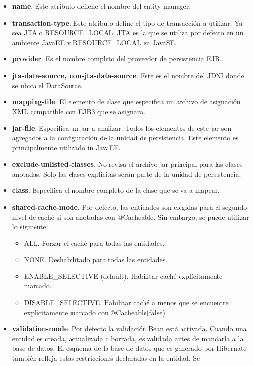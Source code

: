 \documentclass[a4paper,12pt]{article}
\begin{document}
\begin{itemize}
 \item \textbf{name}. Este atributo defiene el nombre del entity manager.
 \item \textbf{transaction-type}. Este atributo define el tipo de transacción a 
utilizar. Ya sea JTA o RESOURCE\_LOCAL, JTA es la que se utiliza por defecto en 
un ambiente JavaEE y RESOURCE\_LOCAL en JavaSE.
\item \textbf{provider}. Es el nombre completo del proveedor de persistencia 
EJB.
\item \textbf{jta-data-source, non-jta-data-source}. Este es el nombre del JDNI 
donde se ubica el DataSource.
\item \textbf{mapping-file}. El elemento de clase que especifica un archivo de 
asignación XML compatible con EJB3 que se asignara.
\item \textbf{jar-file}. Especifica un jar a analizar. Todos los elementos de 
este jar son agregados a la configuración de la unidad de persistencia. Este 
elemento es principalmente utilizado in JavaEE.
\item \textbf{exclude-unlisted-classes}. No revisa el archivo jar principal 
para las clases anotadas. Solo las clases explicitas serán parte de la unidad 
de persistencia.
\item \textbf{class}. Especifica el nombre completo de la clase que se va a 
mapear.
\item \textbf{shared-cache-mode}. Por defecto, las entidades son elegidas para 
el segundo nivel de caché si son anotadas con $@$Cacheable. Sin embargo, se 
puede utilizar lo siguiente:
    \begin{itemize}
    \item ALL. Forzar el caché para todas las entidades.
    \item NONE. Deshabilitado para todas las entidades.
    \item ENABLE\_SELECTIVE (default). Habilitar caché explícitamente marcado.
    \item DISABLE\_SELECTIVE. Habilitar caché a menos que se encuentre 
    explícitamente marcado con $@$Cacheable(false)
    \end{itemize}
\item \textbf{validation-mode}. Por defecto la validación Bean está activada. 
Cuando una entidad es creada, actualizada o borrada, es validada antes de 
mandarla a la base de datos. El esquema de la base de datos que es generado por 
Hibernate también refleja estas restricciones declaradas en la entidad. Se 

\end{itemize}
\end{document}

